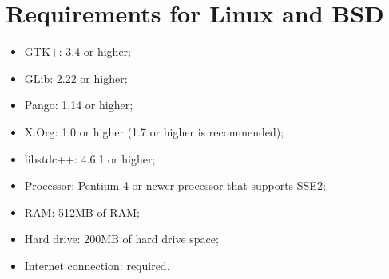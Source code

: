 \documentclass[ManualeUtente]{subfiles}
\begin{document}
\section{Requirements for Linux and BSD}
\begin{itemize}
	\item {GTK+:} 3.4 or higher;
	\item {GLib:} 2.22 or higher;
	\item {Pango:} 1.14 or higher;
	\item {X.Org:} 1.0 or higher (1.7 or higher is recommended);
	\item {libstdc++:} 4.6.1 or higher;
	\item {Processor:} Pentium 4 or newer processor that supports SSE2;
	\item {RAM:} 512MB of RAM;
	\item {Hard drive:} 200MB of hard drive space;
	\item {Internet connection:} required.
\end{itemize}
\end{document}
